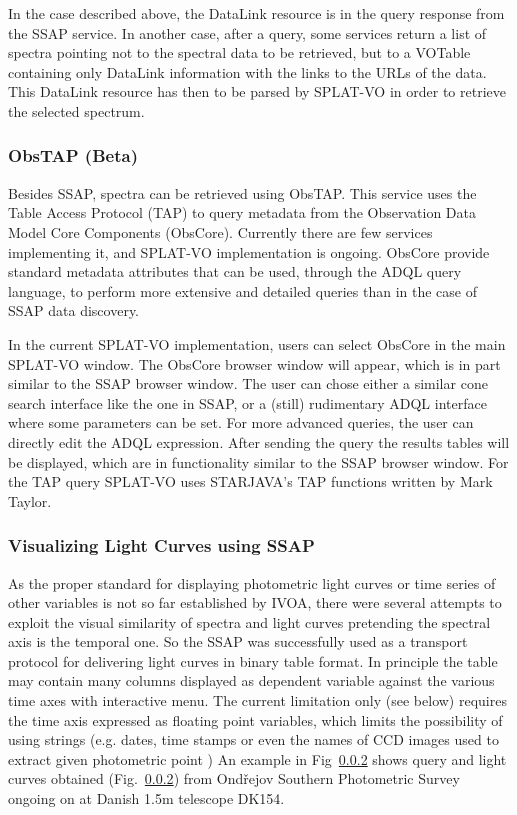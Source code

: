 \documentclass[final,authoryear,5p,times,twocolumn]{elsarticle}
\begin{document}
In the case described above, the DataLink resource is in the query
response from the SSAP service. In another case, after a query, some
services return a list of spectra pointing not to the spectral data to
be retrieved, but to a VOTable containing only DataLink information
with the links to the URLs of the data. This DataLink resource has
then to be parsed by SPLAT-VO in order to retrieve the selected spectrum.

\subsubsection{ObsTAP (Beta)}

Besides SSAP, spectra can be retrieved using ObsTAP. This service uses
the Table Access Protocol (TAP) to query metadata from the Observation
Data Model Core Components (ObsCore). Currently there are few services
implementing it, and SPLAT-VO implementation is ongoing.  ObsCore
provide standard metadata attributes that can be used, through the
ADQL query language, to perform more extensive and detailed queries
than in the case of SSAP data discovery.

In the current SPLAT-VO implementation, users can select ObsCore in the
main SPLAT-VO window. The ObsCore browser window will appear, which is in
part similar to the SSAP browser window. The user can chose either a
similar cone search interface like the one in SSAP, or a (still)
rudimentary ADQL interface where some parameters can be set. For more
advanced queries, the user can directly edit the ADQL
expression. After sending the query the results tables will be
displayed, which are in functionality similar to the SSAP browser
window. For the TAP query SPLAT-VO uses STARJAVA's TAP functions written
by Mark Taylor.


\subsubsection{Visualizing Light Curves using  SSAP}

As the proper standard for displaying photometric light curves or time
series of other variables is not so far established by IVOA, there were
several attempts to exploit the visual similarity of spectra and light
curves pretending the spectral axis is the temporal one.  So the SSAP
was successfully used as a transport protocol for delivering light
curves in binary table format. In principle the table may contain many
columns displayed as dependent variable against the various time axes
with interactive menu.  The current limitation only (see below)
requires the time axis expressed as floating point variables, which
limits the possibility of using strings (e.g. dates, time stamps or
even the names of CCD images used to extract given photometric point )
An example in Fig~\ref{} shows  query and light curves obtained  (Fig.~\ref{})  from
Ond\v{r}ejov Southern Photometric Survey \citep{} ongoing on  at Danish 1.5m telescope DK154.
\end{document}
